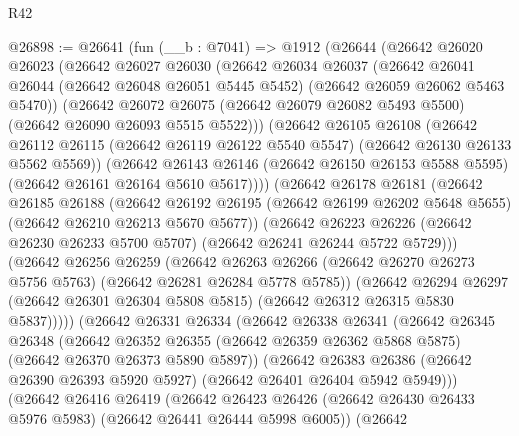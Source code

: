 \begin{lexlean}{R42}
\begin{coremodule}
{@26898 := @26641
    (fun (__b : @7041) =>
    @1912
      (@26644
        (@26642
          @26020
          @26023
          (@26642
            @26027
            @26030
            (@26642
              @26034
              @26037
              (@26642
                @26041
                @26044
                (@26642 @26048 @26051 @5445 @5452)
                (@26642 @26059 @26062 @5463 @5470))
              (@26642
                @26072
                @26075
                (@26642 @26079 @26082 @5493 @5500)
                (@26642 @26090 @26093 @5515 @5522)))
            (@26642
              @26105
              @26108
              (@26642
                @26112
                @26115
                (@26642 @26119 @26122 @5540 @5547)
                (@26642 @26130 @26133 @5562 @5569))
              (@26642
                @26143
                @26146
                (@26642 @26150 @26153 @5588 @5595)
                (@26642 @26161 @26164 @5610 @5617))))
          (@26642
            @26178
            @26181
            (@26642
              @26185
              @26188
              (@26642
                @26192
                @26195
                (@26642 @26199 @26202 @5648 @5655)
                (@26642 @26210 @26213 @5670 @5677))
              (@26642
                @26223
                @26226
                (@26642 @26230 @26233 @5700 @5707)
                (@26642 @26241 @26244 @5722 @5729)))
            (@26642
              @26256
              @26259
              (@26642
                @26263
                @26266
                (@26642 @26270 @26273 @5756 @5763)
                (@26642 @26281 @26284 @5778 @5785))
              (@26642
                @26294
                @26297
                (@26642 @26301 @26304 @5808 @5815)
                (@26642 @26312 @26315 @5830 @5837)))))
        (@26642
          @26331
          @26334
          (@26642
            @26338
            @26341
            (@26642
              @26345
              @26348
              (@26642
                @26352
                @26355
                (@26642 @26359 @26362 @5868 @5875)
                (@26642 @26370 @26373 @5890 @5897))
              (@26642
                @26383
                @26386
                (@26642 @26390 @26393 @5920 @5927)
                (@26642 @26401 @26404 @5942 @5949)))
            (@26642
              @26416
              @26419
              (@26642
                @26423
                @26426
                (@26642 @26430 @26433 @5976 @5983)
                (@26642 @26441 @26444 @5998 @6005))
              (@26642
}
\end{coremodule}
\end{lexlean}
